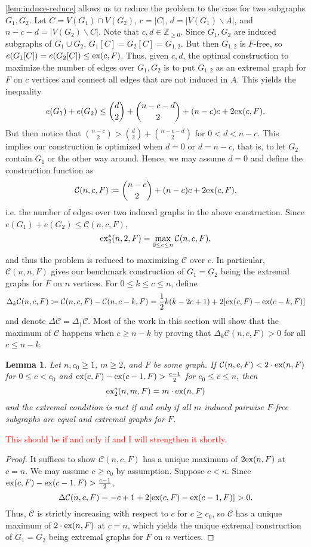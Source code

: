 \documentclass[12pt]{report}
\newtheorem{lemma}[theorem]{Lemma}
\newcommand*{\Z}{\mathbb{Z}}
\newcommand*{\ex}{\textnormal{ex}}
\newcommand*{\dex}{\textnormal{ex}_2}
\newcommand*{\con}{\mathcal{C}}
\begin{document}
\cref{lem:induce-reduce} allows us to reduce the problem to the case for two subgraphs $G_1, G_2$. Let $C = V(G_1) \cap V(G_2)$, $c = |C|$, $d = |V(G_1) \backslash A|$, and $n - c - d = |V(G_2) \backslash C|$. Note that $c, d \in \Z_{\geq 0}$. Since $G_1, G_2$ are induced subgraphs of $G_1 \cup G_2$, $G_1[C] = G_2[C] = G_{1, 2}$. But then $G_{1, 2}$ is $F$-free, so $e(G_1[C]) = e(G_2[C]) \leq \ex(c, F)$. Thus, given $c, d$, the optimal construction to maximize the number of edges over $G_1, G_2$ is to put $G_{1, 2}$ as an extremal graph for $F$ on $c$ vertices and connect all edges that are not induced in $A$. This yields the inequality
\[
  e(G_1) + e(G_2) \leq \binom{d}{2} + \binom{n - c - d}{2} + (n - c)c + 2\ex(c, F).
\]
But then notice that $\binom{n - c}{2} > \binom{d}{2} + \binom{n - c - d}{2}$ for $0 < d < n - c$. This implies our construction is optimized when $d = 0$ or $d = n - c$, that is, to let $G_2$ contain $G_1$ or the other way around. Hence, we may assume $d = 0$ and define the construction function as
\[
  \con(n, c, F) \coloneq \binom{n - c}{2} + (n - c)c + 2\ex(c, F),
\]
i.e. the number of edges over two induced graphs in the above construction. Since $e(G_1) + e(G_2) \leq \con(n, c, F)$, 
\[
  \dex^*(n, 2, F) = \max_{0 \leq c \leq n} \con(n, c, F),
\]
and thus the problem is reduced to maximizing $\con$ over $c$. In particular, $\con(n, n, F)$ gives our benchmark construction of $G_1 = G_2$ being the extremal graphs for $F$ on $n$ vertices. For $0 \leq k \leq c \leq n$, define
\[
  \Delta_k \con(n, c, F) \coloneq \con(n, c, F) - \con(n, c - k, F) = \frac{1}{2}k(k - 2c + 1) + 2[\ex(c, F) - \ex(c - k, F)]
\]
and denote $\Delta \con = \Delta_1 \con$. Most of the work in this section will show that the maximum of $\con$ happens when $c \geq n - k$ by proving that $\Delta_k \con(n, c, F) > 0$ for all $c \leq n - k$.

\begin{lemma}\label{lem:induce-cond}
  Let $n, c_0 \geq 1$, $m \geq 2$, and $F$ be some graph. If $\con(n, c, F)< 2 \cdot \ex(n, F)$ for $0 \leq c < c_0$ and $\ex(c, F) - \ex(c - 1, F) > \frac{c - 1}{2}$ for $c_0 \leq c \leq n$, then
  \[
    \dex^*(n, m, F) = m \cdot \ex(n, F)
  \]
  and the extremal condition is met if and only if all $m$ induced pairwise $F$-free subgraphs are equal and extremal graphs for $F$.
\end{lemma}

\textcolor{red}{This should be if and only if and I will strengthen it shortly.}

\begin{proof}
  It suffices to show $\con(n, c, F)$ has a unique maximum of $2\ex(n, F)$ at $c = n$. We may assume $c \geq c_0$ by assumption. Suppose $c < n$. Since $\ex(c, F) - \ex(c - 1, F) > \frac{c - 1}{2}$,
  \[
    \Delta \con(n, c, F) = - c + 1 + 2[\ex(c, F) - \ex(c - 1, F)] > 0.
  \]
  Thus, $\con$ is strictly increasing with respect to $c$ for $c \geq c_0$, so $\con$ has a unique maximum of $2 \cdot \ex(n, F)$ at $c = n$, which yields the unique extremal construction of $G_1 = G_2$ being extremal graphs for $F$ on $n$ vertices.
\end{proof}
\end{document}

